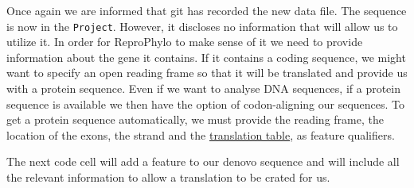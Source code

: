 \documentclass[letterpaper,10pt,english]{/usr/share/sphinx/texinputs/sphinxhowto}
\begin{document}
        
    
Once again we are informed that git has recorded the new data file. The
sequence is now in the \texttt{Project}. However, it discloses no
information that will allow us to utilize it. In order for ReproPhylo to
make sense of it we need to provide information about the gene it
contains. If it contains a coding sequence, we might want to specify an
open reading frame so that it will be translated and provide us with a
protein sequence. Even if we want to analyse DNA sequences, if a protein
sequence is available we then have the option of codon-aligning our
sequences. To get a protein sequence automatically, we must provide the
reading frame, the location of the exons, the strand and the
\href{http://www.ncbi.nlm.nih.gov/Taxonomy/Utils/wprintgc.cgi}{translation
table}, as feature qualifiers.

The next code cell will add a feature to our denovo sequence and will
include all the relevant information to allow a translation to be crated
for us.

\end{document}
